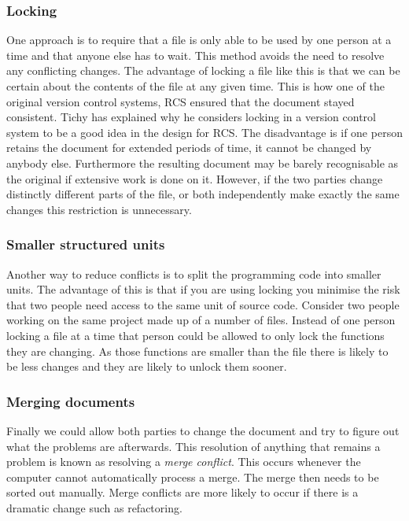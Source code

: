 \subsubsection{Locking}
One approach is to require that a file is only able to be used by one person at a time and that anyone else has to wait. This method avoids the need to resolve any conflicting changes.  The advantage of locking a file like this is that we can be certain about the contents of the file at any given time. This is how one of the original version control systems, RCS ensured that the document stayed consistent. Tichy \cite{Tichy1982} has explained why he considers locking in a version control system to be a good idea in the design for RCS. The disadvantage is if one person retains the document for extended periods of time, it cannot be changed by anybody else. Furthermore the resulting document may be barely recognisable as the original if extensive work is done on it. However, if the two parties change distinctly different parts of the file, or both independently make exactly the same changes this restriction is unnecessary. 
\subsubsection{Smaller structured units}
Another way to reduce conflicts is to split the programming code into smaller units.  The advantage of this is that if you are using locking you minimise the risk that two people need access to the same unit of source code. Consider two people working on the same project made up of a number of files.  Instead of one person locking a file at a time that person could be allowed to only lock the functions they are changing. As those functions are smaller than the file there is likely to be less changes and they are likely to unlock them sooner.
\subsubsection{Merging documents}
Finally we could allow both parties to change the document and try to figure out what the problems are afterwards.  This resolution of anything that remains a problem is known as resolving a \emph{merge conflict}. This occurs whenever the computer cannot automatically process a merge.  The merge then needs to be sorted out manually. Merge conflicts are more likely to occur if there is a dramatic change such as refactoring.

